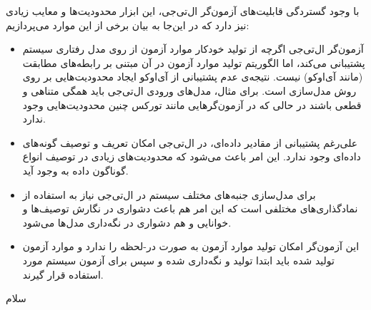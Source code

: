 با وجود گستردگی قابلیت‌های آزمون‌گر ال‌تی‌جی، این ابزار محدودیت‌ها و معایب زیادی نیز دارد که در این‌جا به بیان برخی از این موارد می‌پردازیم:
\begin{itemize}
\item آزمون‌گر ال‌تی‌جی اگرچه از تولید خودکار موارد آزمون از روی مدل رفتاری سیستم پشتیبانی می‌کند، اما الگوریتم تولید موارد آزمون در آن مبتنی بر رابطه‌های مطابقت (مانند آی‌اوکو) نیست. نتیجه‌ی عدم پشتیبانی از آی‌اوکو ایجاد محدودیت‌هایی بر روی روش مدل‌سازی است. برای مثال، مدل‌های ورودی ال‌تی‌جی باید همگی متناهی و قطعی باشند در حالی که در آزمون‌گرهایی مانند تورکس چنین محدودیت‌هایی وجود ندارد.
\item علی‌رغم پشتیبانی از مقادیر داده‌ای، در ال‌تی‌جی امکان تعریف و توصیف گونه‌های داده‌ای وجود ندارد. این امر باعث می‌شود که محدودیت‌های زیادی در توصیف انواع گوناگون داده به وجود آید.
\item برای مدل‌سازی جنبه‌های مختلف سیستم در ال‌تی‌جی نیاز به استفاده از نمادگذاری‌های مختلفی است که این امر هم باعث دشواری در نگارش توصیف‌ها و خوانایی و هم دشواری در نگه‌داری مدل‌ها می‌شود.
\item این آزمون‌گر امکان تولید موارد آزمون به صورت در-لحظه را ندارد و موارد آزمون تولید شده باید ابتدا تولید و نگه‌داری شده و سپس برای آزمون سیستم مورد استفاده قرار گیرند.
\end{itemize}

سلام